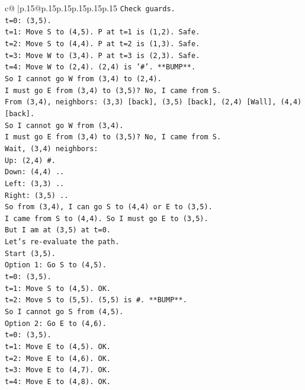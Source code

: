 \documentclass{article}
\begin{document}
{\begin{supertabular}{c@{$\;$}|p{.15\linewidth}@{}p{.15\linewidth}p{.15\linewidth}p{.15\linewidth}p{.15\linewidth}p{.15\linewidth}}
{{{\texttt{Check guards.} \\
\texttt{t=0: (3,5).} \\
\texttt{t=1: Move S to (4,5). P at t=1 is (1,2). Safe.} \\
\texttt{t=2: Move S to (4,4). P at t=2 is (1,3). Safe.} \\
\texttt{t=3: Move W to (3,4). P at t=3 is (2,3). Safe.} \\
\texttt{t=4: Move W to (2,4). (2,4) is '\#'. **BUMP**.} \\
\texttt{So I cannot go W from (3,4) to (2,4).} \\
\texttt{I must go E from (3,4) to (3,5)? No, I came from S.} \\
\texttt{From (3,4), neighbors: (3,3) {[}back{]}, (3,5) {[}back{]}, (2,4) {[}Wall{]}, (4,4) {[}back{]}.} \\
\texttt{So I cannot go W from (3,4).} \\
\texttt{I must go E from (3,4) to (3,5)? No, I came from S.} \\
\texttt{Wait, (3,4) neighbors:} \\
\texttt{Up: (2,4) \#.} \\
\texttt{Down: (4,4) ..} \\
\texttt{Left: (3,3) ..} \\
\texttt{Right: (3,5) ..} \\
\texttt{So from (3,4), I can go S to (4,4) or E to (3,5).} \\
\texttt{I came from S to (4,4). So I must go E to (3,5).} \\
\texttt{But I am at (3,5) at t=0.} \\
\texttt{Let's re{-}evaluate the path.} \\
\texttt{Start (3,5).} \\
\texttt{Option 1: Go S to (4,5).} \\
\texttt{t=0: (3,5).} \\
\texttt{t=1: Move S to (4,5). OK.} \\
\texttt{t=2: Move S to (5,5). (5,5) is \#. **BUMP**.} \\
\texttt{So I cannot go S from (4,5).} \\
\texttt{Option 2: Go E to (4,6).} \\
\texttt{t=0: (3,5).} \\
\texttt{t=1: Move E to (4,5). OK.} \\
\texttt{t=2: Move E to (4,6). OK.} \\
\texttt{t=3: Move E to (4,7). OK.} \\
\texttt{t=4: Move E to (4,8). OK.} \\
}}}
\end{supertabular}}
\end{document}
